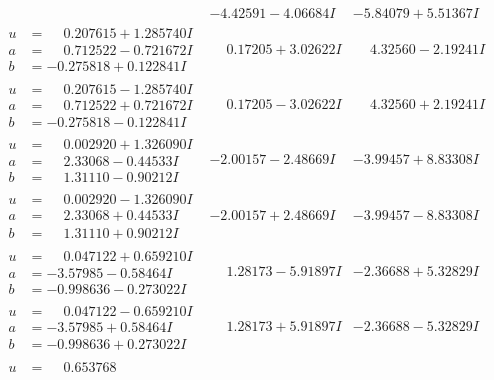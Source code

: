 \documentclass[1p]{elsarticle_modified}
\theoremstyle{definition}
\begin{document}
$$\begin{array}{c|c|c}
 & -4.42591 - 4.06684 I & -5.84079 + 5.51367 I \\ \hline\begin{aligned}
u &= \phantom{-}0.207615 + 1.285740 I \\
a &= \phantom{-}0.712522 - 0.721672 I \\
b &= -0.275818 + 0.122841 I\end{aligned}
 & \phantom{-}0.17205 + 3.02622 I & \phantom{-}4.32560 - 2.19241 I \\ \hline\begin{aligned}
u &= \phantom{-}0.207615 - 1.285740 I \\
a &= \phantom{-}0.712522 + 0.721672 I \\
b &= -0.275818 - 0.122841 I\end{aligned}
 & \phantom{-}0.17205 - 3.02622 I & \phantom{-}4.32560 + 2.19241 I \\ \hline\begin{aligned}
u &= \phantom{-}0.002920 + 1.326090 I \\
a &= \phantom{-}2.33068 - 0.44533 I \\
b &= \phantom{-}1.31110 - 0.90212 I\end{aligned}
 & -2.00157 - 2.48669 I & -3.99457 + 8.83308 I \\ \hline\begin{aligned}
u &= \phantom{-}0.002920 - 1.326090 I \\
a &= \phantom{-}2.33068 + 0.44533 I \\
b &= \phantom{-}1.31110 + 0.90212 I\end{aligned}
 & -2.00157 + 2.48669 I & -3.99457 - 8.83308 I \\ \hline\begin{aligned}
u &= \phantom{-}0.047122 + 0.659210 I \\
a &= -3.57985 - 0.58464 I \\
b &= -0.998636 - 0.273022 I\end{aligned}
 & \phantom{-}1.28173 - 5.91897 I & -2.36688 + 5.32829 I \\ \hline\begin{aligned}
u &= \phantom{-}0.047122 - 0.659210 I \\
a &= -3.57985 + 0.58464 I \\
b &= -0.998636 + 0.273022 I\end{aligned}
 & \phantom{-}1.28173 + 5.91897 I & -2.36688 - 5.32829 I \\ \hline\begin{aligned}
u &= \phantom{-}0.653768\phantom{ +0.000000I} \\

\end{aligned}
\end{array}$$
\end{document}
